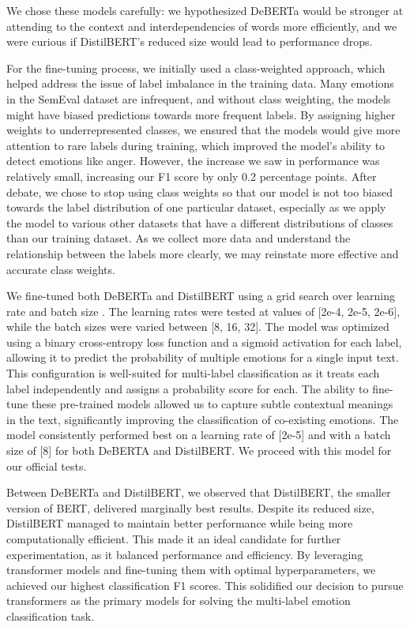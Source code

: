 \documentclass[11pt]{article}
\begin{document}
We chose these models carefully: we hypothesized DeBERTa would be stronger at attending to the context and interdependencies of words more efficiently, and we were curious if DistilBERT's reduced size would lead to performance drops.

For the fine-tuning process, we initially used a class-weighted approach, which helped address the issue of label imbalance in the training data. Many emotions in the SemEval dataset are infrequent, and without class weighting, the models might have biased predictions towards more frequent labels. By assigning higher weights to underrepresented classes, we ensured that the models would give more attention to rare labels during training, which improved the model’s ability to detect emotions like anger. However, the increase we saw in performance was relatively small, increasing our F1 score by only 0.2 percentage points. After debate, we chose to stop using class weights so that our model is not too biased towards the label distribution of one particular dataset, especially as we apply the model to various other datasets that have a different distributions of classes than our training dataset. As we collect more data and understand the relationship between the labels more clearly, we may reinstate more effective and accurate class weights.

We fine-tuned both DeBERTa and DistilBERT using a grid search over learning rate and batch size \cite{WU201926}. The learning rates were tested at values of [2e-4, 2e-5, 2e-6], while the batch sizes were varied between [8, 16, 32]. The model was optimized using a binary cross-entropy loss function and a sigmoid activation for each label, allowing it to predict the probability of multiple emotions for a single input text. This configuration is well-suited for multi-label classification as it treats each label independently and assigns a probability score for each. The ability to fine-tune these pre-trained models allowed us to capture subtle contextual meanings in the text, significantly improving the classification of co-existing emotions. The model consistently performed best on a learning rate of [2e-5] and with a batch size of [8] for both DeBERTA and DistilBERT. We proceed with this model for our official tests.  

Between DeBERTa and DistilBERT, we observed that DistilBERT, the smaller version of BERT, delivered marginally best results. Despite its reduced size, DistilBERT managed to maintain better performance while being more computationally efficient. This made it an ideal candidate for further experimentation, as it balanced performance and efficiency. By leveraging  transformer models and fine-tuning them with optimal hyperparameters, we achieved our highest classification F1 scores. This solidified our decision to pursue transformers as the primary models for solving the multi-label emotion classification task.
\end{document}
